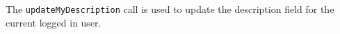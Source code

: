 The \verb+updateMyDescription+ call is used to update the description field for the current logged in user.
